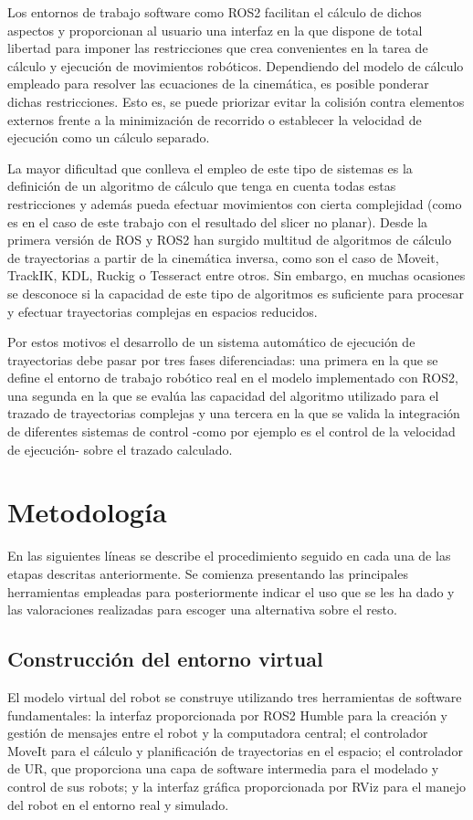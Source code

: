 Los entornos de trabajo software como ROS2 facilitan el cálculo de dichos aspectos y proporcionan al usuario una interfaz en la que dispone de total libertad para imponer las restricciones que crea convenientes en la tarea de cálculo y ejecución de movimientos robóticos. Dependiendo del modelo de cálculo empleado para resolver las ecuaciones de la cinemática, es posible ponderar dichas restricciones. Esto es, se puede priorizar evitar la colisión contra elementos externos frente a la minimización de recorrido o establecer la velocidad de ejecución como un cálculo separado.

La mayor dificultad que conlleva el empleo de este tipo de sistemas es la definición de un algoritmo de cálculo que tenga en cuenta todas estas restricciones y además pueda efectuar movimientos con cierta complejidad (como es en el caso de este trabajo con el resultado del slicer no planar). Desde la primera versión de \acrshort{ROS} y ROS2 han surgido multitud de algoritmos de cálculo de trayectorias a partir de la cinemática inversa, como son el caso de Moveit\cite{moveit_documentacion}, TrackIK\cite{tracik}, KDL\cite{kdl}, Ruckig\cite{ruckig} o Tesseract\cite{tesseract} entre otros. Sin embargo, en muchas ocasiones se desconoce si la capacidad de este tipo de algoritmos es suficiente para procesar y efectuar trayectorias complejas en espacios reducidos. 

Por estos motivos el desarrollo de un sistema automático de ejecución de trayectorias debe pasar por tres fases diferenciadas: una primera en la que se define el entorno de trabajo robótico real en el modelo implementado con ROS2, una segunda en la que se evalúa las capacidad del algoritmo utilizado para el trazado de trayectorias complejas y una tercera en la que se valida la integración de diferentes sistemas de control -como por ejemplo es el control de la velocidad de ejecución- sobre el trazado calculado.

\section{Metodología}

En las siguientes líneas se describe el procedimiento seguido en cada una de las etapas descritas anteriormente. Se comienza presentando las principales herramientas empleadas para posteriormente indicar el uso que se les ha dado y las valoraciones realizadas para escoger una alternativa sobre el resto.

\subsection{Construcción del entorno virtual}
El modelo virtual del robot se construye utilizando tres herramientas de software fundamentales: la interfaz proporcionada por ROS2 Humble para la creación y gestión de mensajes entre el robot y la computadora central; el controlador MoveIt para el cálculo y planificación de trayectorias en el espacio; el controlador de UR, que proporciona una capa de software intermedia para el modelado y control de sus robots; y la interfaz gráfica proporcionada por RViz para el manejo del robot en el entorno real y simulado.

